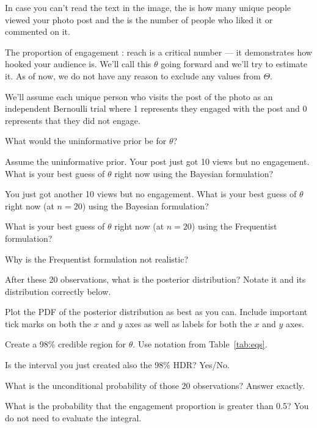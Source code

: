 \documentclass[12pt]{article}
\begin{document}
\noindent In case you can't read the text in the image, the  is how many unique people viewed your photo post and the  is the number of people who liked it or commented on it. 

The proportion of engagement : reach is a critical number --- it demonstrates how hooked your audience is. We'll call this $\theta$ going forward and we'll try to estimate it. As of now, we do not have any reason to exclude any values from $\Theta$. 

We'll assume each unique person who visits the post of the photo as an independent Bernoulli trial where 1 represents they engaged with the post and 0 represents that they did not engage.

\benum

 What would the uninformative prior be for $\theta$? 


 Assume the uninformative prior. Your post just got 10 views but no engagement. What is your best guess of $\theta$ right now using the Bayesian formulation? 

 You just got another 10 views but no engagement. What is your best guess of $\theta$ right now (at $n=20$) using the Bayesian formulation? 

 What is your best guess of $\theta$ right now (at $n=20$) using the Frequentist formulation? 

 Why is the Frequentist formulation not realistic? 

 After these 20 observations, what is the posterior distribution? Notate it and its distribution correctly below. 

 Plot the PDF of the posterior distribution as best as you can. Include important tick marks on both the $x$ and $y$ axes as well as labels for both the $x$ and $y$ axes. 

 Create a 98\% credible region for $\theta$. Use notation from Table~\ref{tab:eqs}. 


 Is the interval you just created also the 98\% HDR? Yes/No. 

 What is the unconditional probability of those 20 observations? Answer exactly. 

 What is the probability that the engagement proportion is greater than 0.5?  You do not need to evaluate the integral. 
\end{document}
